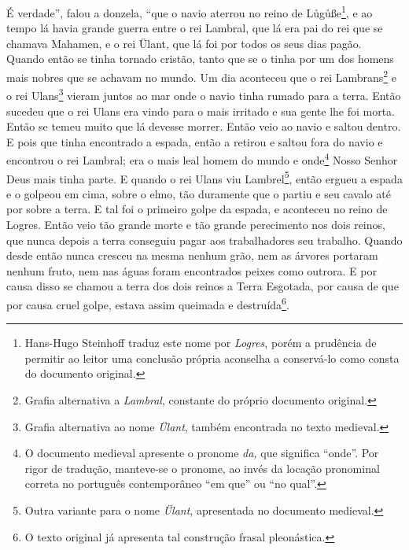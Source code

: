  É verdade”, falou a donzela, “que o navio aterrou no reino de
Lůgůße\footnote{Hans-Hugo Steinhoff traduz este nome por \textit{Logres}, porém
a prudência de permitir ao leitor uma conclusão própria aconselha a conservá-lo
como consta do documento original.},  e ao tempo lá havia grande
guerra entre o rei Lambral, que lá era pai do rei que se chamava Mahamen, e o
rei Ülant, que lá foi por todos os seus dias pagão. Quando então se tinha
tornado cristão, tanto que se o tinha por um dos homens mais nobres que se
achavam no mundo. Um dia aconteceu que o rei Lambrans\footnote{ Grafia
alternativa a \textit{Lambral}, constante do próprio documento original.
 } e o rei Ulans\footnote{ Grafia alternativa ao nome \textit{Ülant},
também encontrada no texto medieval.}  vieram juntos ao mar onde o
navio tinha rumado para a terra. Então sucedeu que o rei Ulans era vindo para o
mais irritado e sua gente lhe foi morta. Então se temeu muito que lá devesse
morrer. Então veio ao navio e saltou dentro. E pois que tinha encontrado a
espada, então a retirou e saltou fora do navio e encontrou o rei Lambral; era o
mais leal homem do mundo e onde\footnote{ O documento medieval apresente o
pronome \textit{da, }que significa “onde”. Por rigor de tradução, manteve-se o
pronome, ao invés da locação pronominal correta no português contemporâneo “em
que” ou “no qual”.}  Nosso Senhor Deus mais tinha parte. E quando o
rei Ulans viu Lambrel\footnote{ Outra variante para o nome \textit{Ülant},
apresentada no documento medieval.},  então ergueu a espada e o
golpeou em cima, sobre o elmo, tão duramente que o partiu e seu cavalo até por
sobre a terra. E tal foi o primeiro golpe da espada, e aconteceu no reino de
Logres. Então veio tão grande morte e tão grande perecimento nos dois reinos,
que nunca depois a terra conseguiu pagar aos trabalhadores seu trabalho. Quando
desde então nunca cresceu na mesma nenhum grão, nem as árvores portaram nenhum
fruto, nem nas águas foram encontrados peixes como outrora. E por causa disso
se chamou a terra dos dois reinos a Terra Esgotada, por causa de que por causa
cruel golpe, estava assim queimada e destruída\footnote{ O texto original já
apresenta tal construção frasal pleonástica.}.  

